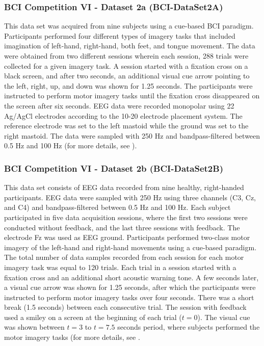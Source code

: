\documentclass{ieeeaccess}
\begin{document}
    \subsubsection{BCI Competition VI - Dataset 2a (BCI-DataSet2A)}
    This data set was acquired from nine subjects using a cue-based BCI paradigm. Participants performed four different types of imagery tasks that included imagination of left-hand, right-hand, both feet, and tongue movement.  The data were obtained from two different sessions wherein each session, 288 trials were collected for a given imagery task.  A session started with a fixation cross on a black screen, and after two seconds, an additional visual cue arrow pointing to the left, right, up, and down was shown for 1.25 seconds. The participants were instructed to perform motor imagery tasks until the fixation cross disappeared on the screen after six seconds. EEG data were recorded monopolar using 22 Ag/AgCl electrodes according to the 10-20 electrode placement system. The reference electrode was set to the left mastoid while the ground was set to the right mastoid. The data were sampled with 250 Hz and bandpass-filtered between 0.5 Hz and 100 Hz (for more details, see \cite{tangermann2012review}).  
    
    \subsubsection{BCI Competition VI - Dataset 2b (BCI-DataSet2B)}
    This data set consists of EEG data recorded from nine healthy, right-handed participants. EEG data were sampled with 250 Hz using three channels (C3, Cz, and C4) and bandpass-filtered between 0.5 Hz and 100 Hz. Each subject participated in five data acquisition sessions, where the first two sessions were conducted without feedback, and the last three sessions with feedback. The electrode Fz was used as EEG ground. Participants performed two-class motor imagery of the left-hand and right-hand movements using a cue-based paradigm. The total number of data samples recorded from each session for each motor imagery task was equal to 120 trials. Each trial in a session started with a fixation cross and an additional short acoustic warning tone. A few seconds later, a visual cue arrow was shown for 1.25 seconds, after which the participants were instructed to perform motor imagery tasks over four seconds.  There was a short break (1.5 seconds) between each consecutive trial. The session with feedback used a smiley on a screen at the beginning of each trial ($t=0$). The visual cue was shown between $t=3$ to $t=7.5$ seconds period, where subjects performed the motor imagery tasks (for more details, see \cite{leeb2007brain}. 
        
\end{document}
